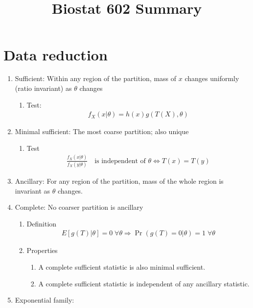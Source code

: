\documentclass{amsart}
\title{Biostat 602 Summary}
\begin{document}
\maketitle

\section{Data reduction}

\begin{enumerate}
\item Sufficient: Within any region of the partition, mass of $x$
  changes uniformly (ratio invariant) as $\theta$ changes
  \begin{enumerate}
  \item Test:
    \begin{align*}
      f_X(x|\theta) = h(x)g(T(X),\theta)
    \end{align*}
  \end{enumerate}
\item Minimal sufficient: The most coarse partition; also unique
  \begin{enumerate}
  \item Test
    \begin{align*}
      \frac{f_X(x|\theta)}{f_X(y|\theta)} \quad \text{is independent of $\theta$} 
      \Leftrightarrow T(x) = T(y)
    \end{align*}
  \end{enumerate}
\item Ancillary: For any region of the partition, mass of the whole
  region is invariant as $\theta$ changes.
\item Complete: No coarser partition is ancillary
  \begin{enumerate}
  \item Definition
    \begin{align*}
      E[g(T)|\theta] = 0 \; \forall \theta 
      \Rightarrow \operatorname{Pr}(g(T) = 0 | \theta) = 1 \; \forall \theta
    \end{align*}
  \item Properties
    \begin{enumerate}
    \item A complete sufficient statistic is also minimal sufficient.
    \item A complete sufficient statistic is independent of any
      ancillary statistic.
    \end{enumerate}
  \end{enumerate}
\item Exponential family:

\end{enumerate}
\end{document}

